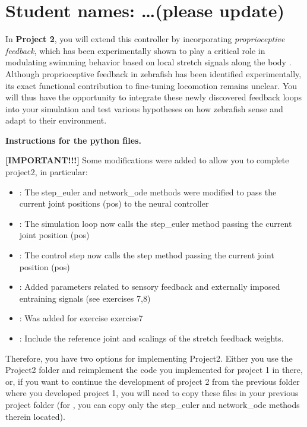 \documentclass{cmc}
\begin{document}
\pagestyle{fancy}
 

\section*{Student names: \ldots (please update)}


In \textbf{Project 2}, you will extend this controller by incorporating \emph{proprioceptive feedback}, which has been experimentally shown to play a critical role in modulating swimming behavior based on local stretch signals along the body \cite{picton_spinal_2021}. Although proprioceptive feedback in zebrafish has been identified experimentally, its exact functional contribution to fine-tuning locomotion remains unclear. You will thus have the opportunity to integrate these newly discovered feedback loops into your simulation and test various hypotheses on how zebrafish sense and adapt to their environment.

\noindent
\textbf{Instructions for the python files. }

\textbf{[IMPORTANT!!!]} Some modifications were added to allow you to complete project2, in particular:
\begin{itemize}
\item {} : The step\_euler and network\_ode methods were modified to pass the current joint positions (pos) to the neural controller
\item {} : The simulation loop now calls the step\_euler method passing the current joint position (pos)
\item {} : The control step now calls the step method passing the current joint position (pos)
\item {} : Added parameters related to sensory feedback and externally imposed entraining signals (see exercises 7,8)
\item {} : Was added for exercise exercise7
\item {} : Include the reference joint and scalings of the stretch feedback weights.
\end{itemize}

Therefore, you have two options for implementing Project2. Either you use the Project2 folder and reimplement the code you implemented for project 1 in there, or, if you want to continue the development of project 2 from the previous folder where you developed project 1, you will need to copy these files in your previous project folder (for , you can copy only the step\_euler and network\_ode methods therein located).
\end{document}
